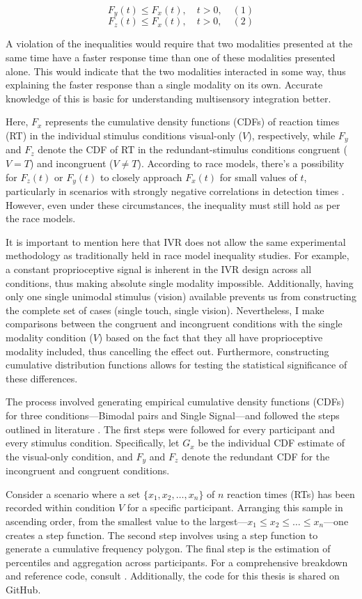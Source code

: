 \documentclass[12pt,oneside,openright]{report}
\begin{document}
\[
F_y(t) \leq F_x(t), \quad t > 0, \quad (1)
\]
\[
F_z(t) \leq F_x(t), \quad t > 0, \quad (2)
\]

A violation of the inequalities would require that two modalities presented at the same time have a faster response time than one of these modalities presented alone. This would indicate that the two modalities interacted in some way, thus explaining the faster response than a single modality on its own. Accurate knowledge of this is basic for understanding multisensory integration better.

Here, $F_x$ represents the cumulative density functions (CDFs) of reaction times (RT) in the individual stimulus conditions visual-only ($V$), respectively, while $F_y$ and $F_z$ denote the CDF of RT in the redundant-stimulus conditions congruent ($V=T$) and incongruent ($V \neq T$). According to race models, there's a possibility for $F_z(t)$ or $F_y(t)$ to closely approach $F_x(t)$ for small values of $t$, particularly in scenarios with strongly negative correlations in detection times \parencite{Ulrich2007}. However, even under these circumstances, the inequality must still hold as per the race models.

It is important to mention here that IVR does not allow the same experimental methodology as traditionally held in race model inequality studies. For example, a constant proprioceptive signal is inherent in the IVR design across all conditions, thus making absolute single modality impossible. Additionally, having only one single unimodal stimulus (vision) available prevents us from constructing the complete set of cases (single touch, single vision). Nevertheless, I make comparisons between the congruent and incongruent conditions with the single modality condition ($V$) based on the fact that they all have proprioceptive modality included, thus cancelling the effect out. Furthermore, constructing cumulative distribution functions allows for testing the statistical significance of these differences.

The process involved generating empirical cumulative density functions (CDFs) for three conditions—Bimodal pairs and Single Signal—and followed the steps outlined in literature \parencite{Ulrich2007}. The first steps were followed for every participant and every stimulus condition. Specifically, let $G_x$ be the individual CDF estimate of the visual-only condition, and $F_y$ and $F_z$ denote the redundant CDF for the incongruent and congruent conditions.

Consider a scenario where a set $\{x_1, x_2, \ldots , x_n\}$ of $n$ reaction times (RTs) has been recorded within condition $V$ for a specific participant. Arranging this sample in ascending order, from the smallest value to the largest—$x_1 \leq x_2 \leq \ldots \leq x_n$—one creates a step function. The second step involves using a step function to generate a cumulative frequency polygon. The final step is the estimation of percentiles and aggregation across participants. For a comprehensive breakdown and reference code, consult \cite{Ulrich2007}. Additionally, the code for this thesis is shared on GitHub.
\end{document}
